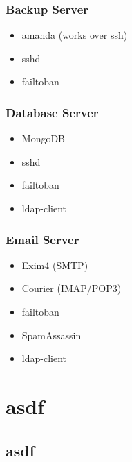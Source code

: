 		\subsubsection{Backup Server}		
		\begin{itemize}
			\item amanda (works over ssh)
			\item sshd
			\item failtoban
		\end{itemize}		
		\subsubsection{Database Server}
			\begin{itemize}
				\item MongoDB
				\item sshd
				\item failtoban
				\item ldap-client
			\end{itemize}
		\subsubsection{Email Server}
			\begin{itemize}
				\item Exim4 (SMTP)
				\item Courier (IMAP/POP3)
				\item failtoban
				\item SpamAssassin
				\item ldap-client
			\end{itemize}
		
\section{asdf}
	\subsection{asdf}


		